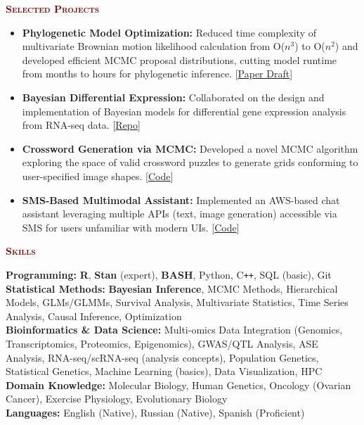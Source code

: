 \documentclass[11pt,margin,line]{resume}
\makeatletter
\renewcommand{\section}[1]{%
  \vspace{0.8em \@plus 0.2em \@minus 0.2em}%
  \phantomsection{}%
  {\raggedright \Large\bfseries\scshape\textcolor{DarkRed}{#1}}%
  \vspace{0.4em \@plus 0.1em \@minus 0.1em}%
  \nopagebreak[3]%
}
\makeatother
\begin{document}
\begin{resume}
\section{\textcolor{DarkRed}{Selected Projects}}
\vspace{-1mm}
\begin{itemize} \itemsep -0.5em
    \item \textbf{Phylogenetic Model Optimization:} Reduced time complexity of multivariate Brownian motion likelihood calculation from O($n^3$) to O($n^2$) and developed efficient MCMC proposal distributions, cutting model runtime from months to hours for phylogenetic inference. [\href{https://github.com/NikVetr/papers/blob/main/sysbio-manuscript\%20/mvBM_manuscript_sysbio.pdf}{Paper Draft}]
    \item \textbf{Bayesian Differential Expression:} Collaborated on the design and implementation of Bayesian models for differential gene expression analysis from RNA-seq data. [\href{https://github.com/bob-carpenter/BayesExpress}{Repo}]
    \item \textbf{Crossword Generation via MCMC:} Developed a novel MCMC algorithm exploring the space of valid crossword puzzles to generate grids conforming to user-specified image shapes. [\href{https://github.com/NikVetr/crossword}{Code}]
    \item \textbf{SMS-Based Multimodal Assistant:} Implemented an AWS-based chat assistant leveraging multiple APIs (text, image generation) accessible via SMS for users unfamiliar with modern UIs. [\href{https://github.com/NikVetr/minor_scripts/blob/master/postdoc/email_gma_chatGPT-clone.py}{Code}]
\end{itemize}
\vspace{-2mm}

\section{\textcolor{DarkRed}{Skills}}
\vspace{-1mm}
\textbf{Programming:} \textbf{R}, \textbf{Stan} (expert), \textbf{BASH}, Python, C\texttt{++}, SQL (basic), Git \\
\textbf{Statistical Methods:} \textbf{Bayesian Inference}, MCMC Methods, Hierarchical Models, GLMs/GLMMs, Survival Analysis, Multivariate Statistics, Time Series Analysis, Causal Inference, Optimization \\
\textbf{Bioinformatics & Data Science:} Multi-omics Data Integration (Genomics, Transcriptomics, Proteomics, Epigenomics), GWAS/QTL Analysis, ASE Analysis, RNA-seq/scRNA-seq (analysis concepts), Population Genetics, Statistical Genetics, Machine Learning (basics), Data Visualization, HPC \\
\textbf{Domain Knowledge:} Molecular Biology, Human Genetics, Oncology (Ovarian Cancer), Exercise Physiology, Evolutionary Biology \\
\textbf{Languages:} English (Native), Russian (Native), Spanish (Proficient)
\vspace{-2mm}


\end{resume}
\end{document}
